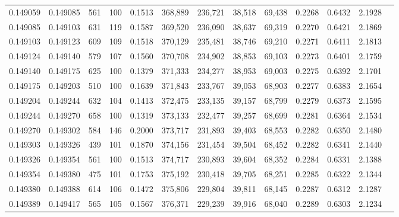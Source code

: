\begin{tabular}{rrrrrrrrrrrrr}
0.149059 & 0.149085 &   561 & 100 &                                     0.1513 & 368,889 & 236,721 &  38,518 &  69,438 & 0.2268 & 0.6432 & 2.1928 \\
0.149085 & 0.149103 &   631 & 119 &                                     0.1587 & 369,520 & 236,090 &  38,637 &  69,319 & 0.2270 & 0.6421 & 2.1869 \\
0.149103 & 0.149123 &   609 & 109 &                                     0.1518 & 370,129 & 235,481 &  38,746 &  69,210 & 0.2271 & 0.6411 & 2.1813 \\
0.149124 & 0.149140 &   579 & 107 &                                     0.1560 & 370,708 & 234,902 &  38,853 &  69,103 & 0.2273 & 0.6401 & 2.1759 \\
0.149140 & 0.149175 &   625 & 100 &                                     0.1379 & 371,333 & 234,277 &  38,953 &  69,003 & 0.2275 & 0.6392 & 2.1701 \\
0.149175 & 0.149203 &   510 & 100 &                                     0.1639 & 371,843 & 233,767 &  39,053 &  68,903 & 0.2277 & 0.6383 & 2.1654 \\
0.149204 & 0.149244 &   632 & 104 &                                     0.1413 & 372,475 & 233,135 &  39,157 &  68,799 & 0.2279 & 0.6373 & 2.1595 \\
0.149244 & 0.149270 &   658 & 100 &                                     0.1319 & 373,133 & 232,477 &  39,257 &  68,699 & 0.2281 & 0.6364 & 2.1534 \\
0.149270 & 0.149302 &   584 & 146 &                                     0.2000 & 373,717 & 231,893 &  39,403 &  68,553 & 0.2282 & 0.6350 & 2.1480 \\
0.149303 & 0.149326 &   439 & 101 &                                     0.1870 & 374,156 & 231,454 &  39,504 &  68,452 & 0.2282 & 0.6341 & 2.1440 \\
0.149326 & 0.149354 &   561 & 100 &                                     0.1513 & 374,717 & 230,893 &  39,604 &  68,352 & 0.2284 & 0.6331 & 2.1388 \\
0.149354 & 0.149380 &   475 & 101 &                                     0.1753 & 375,192 & 230,418 &  39,705 &  68,251 & 0.2285 & 0.6322 & 2.1344 \\
0.149380 & 0.149388 &   614 & 106 &                                     0.1472 & 375,806 & 229,804 &  39,811 &  68,145 & 0.2287 & 0.6312 & 2.1287 \\
0.149389 & 0.149417 &   565 & 105 &                                     0.1567 & 376,371 & 229,239 &  39,916 &  68,040 & 0.2289 & 0.6303 & 2.1234 \\

\end{tabular}
